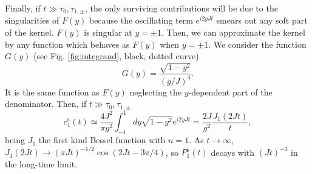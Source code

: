 \documentclass[aps,pra,twocolumn,floatfix,superscriptaddress]{revtex4-1}%
\begin{document}
Finally, if $t\gg \tau_0,\tau_{1,\pm}$, the only surviving contributions will be due to the singularities of $F(y)$ because the oscillating term $e^{i2yJt}$ smears out any soft part of the kernel. $F(y)$ is singular at $y=\pm 1$. Then, we can approximate the kernel by any function which behaves as $F(y)$ when $y=\pm 1$. We consider the function $G(y)$ (see Fig. \ref{fig:integrand}, black, dotted curve)
\begin{equation}
G(y)=\frac{\sqrt{1-y^2}}{(g/J)^4}.\label{eq:G}
\end{equation}
It is the same function as $F(y)$ neglecting the $y$-dependent part of the denominator. Then, if $t\gg \tau_0,\tau_{1,\pm}$
\begin{equation}
c_1^\text{s}(t) \simeq  \frac{4J^2}{\pi g^2}\int_{-1}^1 dy \sqrt{1-y^2} e^{i2yJt}=\frac{2J}{g^2 }\frac{J_1(2Jt)}{t},
\label{eq:c_sc_bessel}
\end{equation}
being $J_1$ the first kind Bessel function with $n=1$. As $t\to\infty$, $J_1(2Jt)\to (\pi Jt)^{-1/2}\cos(2Jt-3\pi /4)$, so $P_1^\text{s}(t)$ decays with $(Jt)^{-3}$ in the long-time limit.


%
%
%



 
\end{document}
